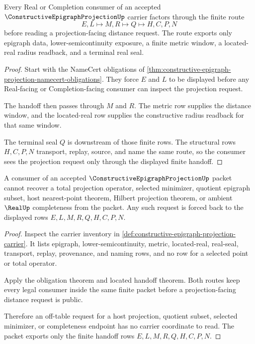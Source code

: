 \begin{theorem}
\label{thm:constructive-epigraph-projection-located-handoff}
Every Real or Completion consumer of an accepted $\ConstructiveEpigraphProjectionUp$ carrier factors through the finite route
$$
E,L \longmapsto M,R \longmapsto Q \longmapsto H,C,P,N
$$
before reading a projection-facing distance request. The route exports only epigraph data, lower-semicontinuity exposure, a finite metric window, a located-real radius readback, and a terminal real seal.
\end{theorem}
\begin{proof}
Start with the NameCert obligations of \autoref{thm:constructive-epigraph-projection-namecert-obligations}. They force $E$ and $L$ to be displayed before any Real-facing or Completion-facing consumer can inspect the projection request.

The handoff then passes through $M$ and $R$. The metric row supplies the distance window, and the located-real row supplies the constructive radius readback for that same window.

The terminal seal $Q$ is downstream of those finite rows. The structural rows $H,C,P,N$ transport, replay, source, and name the same route, so the consumer sees the projection request only through the displayed finite handoff.
\end{proof}

\begin{theorem}
\label{thm:constructive-epigraph-projection-nonescape}
A consumer of an accepted $\ConstructiveEpigraphProjectionUp$ packet cannot recover a total projection operator, selected minimizer, quotient epigraph subset, host nearest-point theorem, Hilbert projection theorem, or ambient $\RealUp$ completeness from the packet. Any such request is forced back to the displayed rows $E,L,M,R,Q,H,C,P,N$.
\end{theorem}
\begin{proof}
Inspect the carrier inventory in \autoref{def:constructive-epigraph-projection-carrier}. It lists epigraph, lower-semicontinuity, metric, located-real, real-seal, transport, replay, provenance, and naming rows, and no row for a selected point or total operator.

Apply the obligation theorem and located handoff theorem. Both routes keep every legal consumer inside the same finite packet before a projection-facing distance request is public.

Therefore an off-table request for a host projection, quotient subset, selected minimizer, or completeness endpoint has no carrier coordinate to read. The packet exports only the finite handoff rows $E,L,M,R,Q,H,C,P,N$.
\end{proof}

